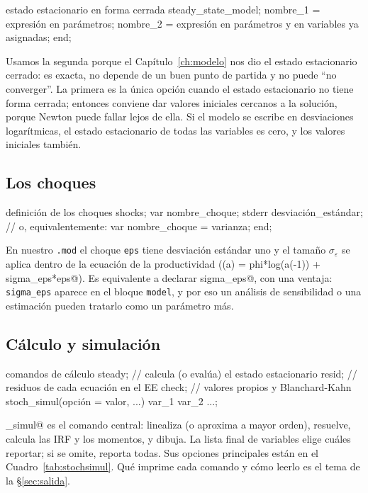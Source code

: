 \documentclass[11pt,a4paper]{report}
\newcommand{\code}[1]{\texttt{#1}}
\begin{document}
\begin{sintaxis}{estado estacionario en forma cerrada}
steady_state_model;
  nombre_1 = expresión en parámetros;
  nombre_2 = expresión en parámetros y en variables ya asignadas;
end;
\end{sintaxis}

\noindent Usamos la segunda porque el Capítulo~\ref{ch:modelo} nos dio el estado
estacionario cerrado: es exacta, no depende de un buen punto de partida y no puede
``no converger''. La primera es la única opción cuando el estado estacionario no tiene
forma cerrada; entonces conviene dar valores iniciales cercanos a la solución, porque
Newton puede fallar lejos de ella. Si el modelo se escribe en desviaciones logarítmicas,
el estado estacionario de todas las variables es cero, y los valores iniciales también.

\subsection{Los choques}
\label{sec:bloqueshocks}

\begin{sintaxis}{definición de los choques}
shocks;
  var nombre_choque; stderr desviación_estándar;
  // o, equivalentemente:  var nombre_choque = varianza;
end;
\end{sintaxis}

\noindent En nuestro \code{.mod} el choque \code{eps} tiene desviación estándar uno y el
tamaño $\sigma_\varepsilon$ se aplica dentro de la ecuación de la productividad
(\lstinline@log(a) = phi*log(a(-1)) + sigma_eps*eps@). Es equivalente a declarar
\lstinline@stderr sigma_eps@, con una ventaja: \code{sigma\_eps} aparece en el bloque
\code{model}, y por eso un análisis de sensibilidad o una estimación pueden tratarlo como
un parámetro más.

\subsection{Cálculo y simulación}
\label{sec:bloquecalc}

\begin{sintaxis}{comandos de cálculo}
steady;    // calcula (o evalúa) el estado estacionario
resid;     // residuos de cada ecuación en el EE
check;     // valores propios y Blanchard-Kahn
stoch_simul(opción = valor, ...) var_1 var_2 ...;
\end{sintaxis}

\noindent \lstinline@stoch_simul@ es el comando central: linealiza (o aproxima a mayor
orden), resuelve, calcula las IRF y los momentos, y dibuja. La lista final de variables
elige cuáles reportar; si se omite, reporta todas. Sus opciones principales están en el
Cuadro~\ref{tab:stochsimul}. Qué imprime cada comando y cómo leerlo es el tema de la
\S\ref{sec:salida}.
\end{document}
